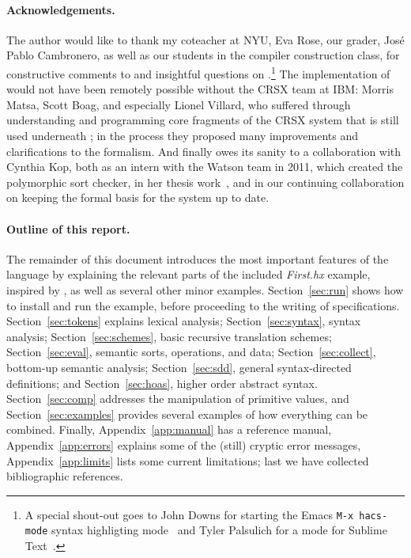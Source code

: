\documentclass[11pt]{article} %
\begin{document}
\paragraph*{Acknowledgements.}

The author would like to thank my coteacher at NYU, Eva Rose, our grader, José Pablo Cambronero, as
well as our students in the compiler construction class, for constructive comments to and insightful
questions on \HAX.\footnote{A special shout-out goes to John Downs for starting the Emacs
  \texttt{M-x hacs-mode} syntax highligting mode~\cite{git:hacsel} and Tyler Palsulich for a \HAX
  mode for Sublime Text~\cite{git:hacs-sublime}.}
The implementation of \HAX would not have been remotely possible without the CRSX team at IBM:
Morris Matsa, Scott Boag, and especially Lionel Villard, who suffered through understanding and
programming core fragments of the CRSX system that is still used underneath \HAX; in the process
they proposed many improvements and clarifications to the formalism.
And finally \HAX owes its sanity to a collaboration with Cynthia Kop, both as an intern with the
Watson team in 2011, which created the polymorphic sort checker, in her thesis work~\cite{Kop:2012},
and in our continuing collaboration on keeping the formal basis for the system up to date.

\paragraph*{Outline of this report.}

The remainder of this document introduces the most important features of the \HAX language by
explaining the relevant parts of the included \emph{First.hx} example, inspired by
\cite[Figure~1.7]{Aho+:2006}, as well as several other minor examples.
Section~\ref{sec:run} shows how to install \HAX and run the example, before proceeding to
the writing of specifications. %
Section~\ref{sec:tokens} explains lexical analysis; %
Section~\ref{sec:syntax}, syntax analysis; %
Section~\ref{sec:schemes}, basic recursive translation schemes; %
Section~\ref{sec:eval}, semantic sorts, operations, and data; %
Section~\ref{sec:collect}, bottom-up semantic analysis; %
Section~\ref{sec:sdd}, general syntax-directed definitions; %
and Section~\ref{sec:hoas}, higher order abstract syntax. %
Section~\ref{sec:comp} addresses the manipulation of primitive values, %
and Section~\ref{sec:examples} provides several examples of how everything can be combined.
Finally, %
Appendix~\ref{app:manual} has a reference manual, %
Appendix~\ref{app:errors} explains some of the (still) cryptic error messages, %
Appendix~\ref{app:limits} lists some current limitations;
last we have collected bibliographic references.
\end{document}
